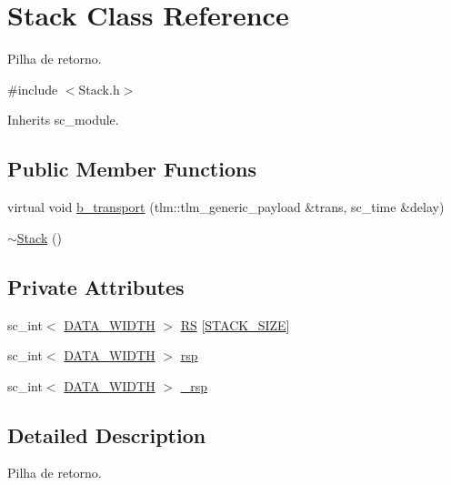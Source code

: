 \hypertarget{classStack}{\section{Stack Class Reference}
\label{classStack}
}


Pilha de retorno.  




{\ttfamily \#include $<$Stack.\+h$>$}



Inherits sc\+\_\+module.

\subsection*{Public Member Functions}
\begin{DoxyCompactItemize}
\item 
virtual void \hyperlink{classStack_a188c0ef6d86bb6100b6c1a63e821bd7f}{b\+\_\+transport} (tlm\+::tlm\+\_\+generic\+\_\+payload \&trans, sc\+\_\+time \&delay)
\item 
\hyperlink{classStack_a40bd5dff912f0e5290777c4b46d17809}{$\sim$\+Stack} ()
\end{DoxyCompactItemize}
\subsection*{Private Attributes}
\begin{DoxyCompactItemize}
\item 
sc\+\_\+int$<$ \hyperlink{Defines_8h_af087b76f9707be9d3b43ba0c782c31c3}{D\+A\+T\+A\+\_\+\+W\+I\+D\+T\+H} $>$ \hyperlink{classStack_afaf63d71e48a971dd6556df7bfd49674}{R\+S} \mbox{[}\hyperlink{Defines_8h_a6423a880df59733d2d9b509c7718d3a9}{S\+T\+A\+C\+K\+\_\+\+S\+I\+Z\+E}\mbox{]}
\item 
sc\+\_\+int$<$ \hyperlink{Defines_8h_af087b76f9707be9d3b43ba0c782c31c3}{D\+A\+T\+A\+\_\+\+W\+I\+D\+T\+H} $>$ \hyperlink{classStack_a1bea5600d11871fa8b06e213537a418e}{rsp}
\item 
sc\+\_\+int$<$ \hyperlink{Defines_8h_af087b76f9707be9d3b43ba0c782c31c3}{D\+A\+T\+A\+\_\+\+W\+I\+D\+T\+H} $>$ \hyperlink{classStack_ad8eeb266003348c5d2611d8078e172e5}{\+\_\+rsp}
\end{DoxyCompactItemize}


\subsection{Detailed Description}
Pilha de retorno. 

